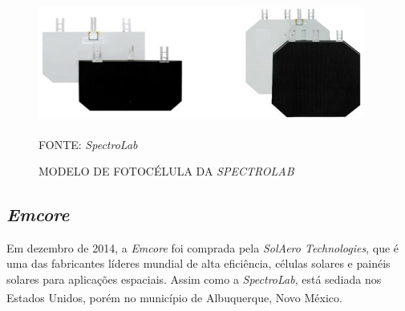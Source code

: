 \documentclass[
	12pt,				%
	openright,			%
	oneside,			%
	a4paper,			%
	english,			%
	french,				%
	spanish,			%
	brazil,				%
	oldfontcommands
	]{abntex2}
\begin{document}
	\begin{figure}[th]
		\caption{MODELO DE FOTOCÉLULA DA \textit{SPECTROLAB}}
		\label{Fig_Cell_Spectro}
		\centering
		\includegraphics[width=1.0\linewidth]{./figs/UTJ}
			
		\begin{small}
			FONTE: \textit{SpectroLab}\textsuperscript{\cite{SpectroLab2}}
		\end{small}		
	\end{figure}

\subsection[Emcore]{\textit{Emcore}}

	Em dezembro de 2014, a \textit{Emcore} foi comprada pela \textit{SolAero Technologies}, que é uma das fabricantes líderes mundial de alta eficiência, células solares e painéis solares para aplicações espaciais. Assim como a \textit{SpectroLab}, está sediada nos Estados Unidos, porém no município de Albuquerque, Novo México.\textsuperscript{\cite{Emcore}}\textsuperscript{\cite{Emcore2}}
	
\end{document}
